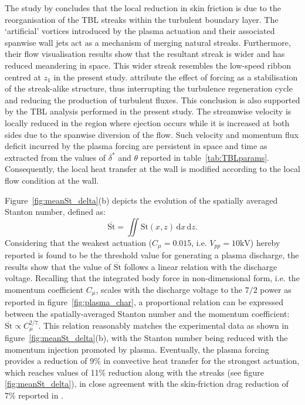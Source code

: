 The study by \citet{cheng_wong_hussain_schroder_zhou_2021} concludes that the local reduction in skin friction is due to the reorganisation of the TBL streaks within the turbulent boundary layer. The ‘artificial’ vortices introduced by the plasma actuation and their associated spanwise wall jets act as a mechanism of merging natural streaks. Furthermore, their flow visualisation results show that the resultant streak is wider and has reduced meandering in space. This wider streak resembles the low-speed ribbon centred at $z_1$ in the present study. \citet{cheng_wong_hussain_schroder_zhou_2021} attribute the effect of forcing as a stabilisation of the streak-alike structure, thus interrupting the turbulence regeneration cycle and reducing the production of turbulent fluxes. This conclusion is also supported by the TBL analysis performed in the present study. The streamwise velocity is locally reduced in the region where ejection occurs while it is increased at both sides due to the spanwise diversion of the flow. Such velocity and momentum flux deficit incurred by the plasma forcing are persistent in space and time as extracted from the values of $\delta^*$ and $\theta$ reported in table~\ref{tab:TBLparams}. Consequently, the local heat transfer at the wall is modified according to the local flow condition at the wall.

Figure~\ref{fig:meanSt_delta}(b) depicts the evolution of the spatially averaged Stanton number, defined as:
\begin{equation}
    	\overline{\mathrm{St}} = \iint {\mathrm{St}(x,z)} \,\mathrm{d}x\,\mathrm{d}z.
\end{equation}
Considering that the weakest actuation ($C_\mu = 0.015$, i.e. $V_{pp}=10\mathrm{kV}$) hereby reported is found to be the threshold value for generating a plasma discharge, the results show that the value of $\overline{\mathrm{St}}$ follows a linear relation with the discharge voltage. Recalling that the integrated body force in non-dimensional form, i.e. the momentum coefficient $C_\mu$, scales with the discharge voltage to the $7/2$ power as reported in figure~\ref{fig:plasma_char}, a proportional relation can be expressed between the spatially-averaged Stanton number and the momentum coefficient: $\overline{\mathrm{St}} \propto C_\mu^{2/7}$. This relation reasonably matches the experimental data as shown in figure~\ref{fig:meanSt_delta}(b), with the Stanton number being reduced with the momentum injection promoted by plasma. Eventually, the plasma forcing provides a reduction of 9\% in convective heat transfer for the strongest actuation, which reaches values of 11\% reduction along with the streaks (see figure \ref{fig:meanSt_delta}), in close agreement with the skin-friction drag reduction of 7\% reported in \citet{cheng_wong_hussain_schroder_zhou_2021}. 

